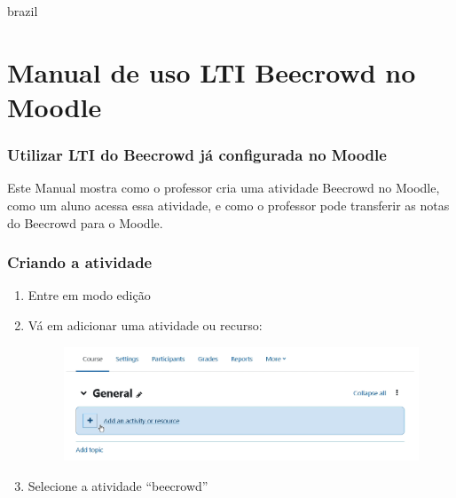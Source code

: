 \begin{otherlanguage*}{brazil}

\chapter{Manual de uso LTI Beecrowd no Moodle}
\label{manual:uso-lti}

\subsection{Utilizar LTI do Beecrowd já configurada no Moodle}

Este Manual mostra como o professor cria uma atividade Beecrowd no Moodle, como um aluno acessa essa atividade, e como o professor pode transferir as notas do Beecrowd para o Moodle.

\subsection{Criando a atividade}

\begin{enumerate}
    \item Entre em modo edição
    \item Vá em adicionar uma atividade ou recurso:

    \begin{figure}[H]
        \centering
            \includegraphics[scale=0.425]{pictures/apendices/apendice_b_1.png}
    \end{figure}

    \item Selecione a atividade “beecrowd”


\end{enumerate}
\end{otherlanguage*}
